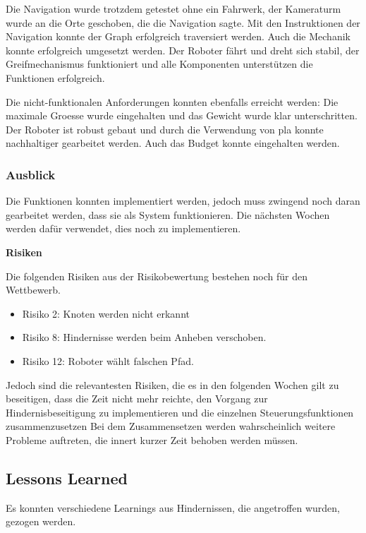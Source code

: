 Die Navigation wurde trotzdem getestet ohne ein Fahrwerk, der Kameraturm wurde an die Orte geschoben, die die Navigation sagte. Mit den Instruktionen der Navigation konnte der Graph erfolgreich traversiert werden. Auch die Mechanik konnte erfolgreich umgesetzt werden. Der Roboter fährt und dreht sich stabil, der Greifmechanismus funktioniert und alle Komponenten unterstützen die Funktionen erfolgreich.

Die nicht-funktionalen Anforderungen konnten ebenfalls erreicht werden: Die maximale Groesse wurde eingehalten und das Gewicht wurde klar unterschritten. Der Roboter ist robust gebaut und durch die Verwendung von \acrshort{pla} konnte nachhaltiger gearbeitet werden. Auch das Budget konnte eingehalten werden.

\subsubsection{Ausblick}

Die Funktionen konnten implementiert werden, jedoch muss zwingend noch daran gearbeitet werden, dass sie als System funktionieren. Die nächsten Wochen werden dafür verwendet, dies noch zu implementieren.

\textbf{Risiken}

Die folgenden Risiken aus der Risikobewertung bestehen noch für den Wettbewerb. 

\begin{itemize}
    \item Risiko 2: Knoten werden nicht erkannt
    \item Risiko 8: Hindernisse werden beim Anheben verschoben.
    \item Risiko 12: Roboter wählt falschen Pfad.
\end{itemize}

Jedoch sind die relevantesten Risiken, die es in den folgenden Wochen gilt zu beseitigen, dass die Zeit nicht mehr reichte, den Vorgang zur Hindernisbeseitigung zu implementieren und die einzelnen Steuerungsfunktionen zusammenzusetzen
Bei dem Zusammensetzen werden wahrscheinlich weitere Probleme auftreten, die innert kurzer Zeit behoben werden müssen.



\subsection{Lessons Learned}

Es konnten verschiedene Learnings aus Hindernissen, die angetroffen wurden, gezogen werden.

